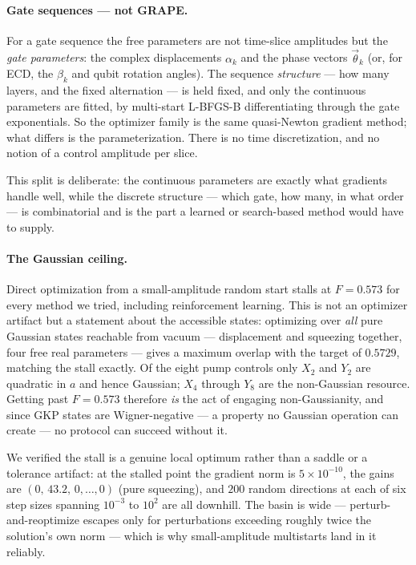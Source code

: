 \documentclass[10pt]{article}
\begin{document}
\paragraph{Gate sequences --- not GRAPE.} For a gate sequence the free parameters
are not time-slice amplitudes but the \emph{gate parameters}: the complex
displacements $\alpha_k$ and the phase vectors $\vec\theta_k$ (or, for ECD, the
$\beta_k$ and qubit rotation angles). The sequence \emph{structure} --- how many
layers, and the fixed alternation --- is held fixed, and only the continuous
parameters are fitted, by multi-start L-BFGS-B differentiating through the gate
exponentials. So the optimizer family is the same quasi-Newton
gradient method; what differs is the parameterization. There is no time
discretization, and no notion of a control amplitude per slice.

This split is deliberate: the continuous parameters are exactly what gradients
handle well, while the discrete structure --- which gate, how many, in what order
--- is combinatorial and is the part a learned or search-based method would have
to supply.

\paragraph{The Gaussian ceiling.} Direct optimization from a small-amplitude
random start stalls at $F=0.573$ for every method we tried, including
reinforcement learning. This is not an optimizer artifact but a statement about
the accessible states: optimizing over \emph{all} pure Gaussian states reachable
from vacuum --- displacement and squeezing together, four free real parameters ---
gives a maximum overlap with the target of $0.5729$, matching the stall exactly.
Of the eight pump controls only $X_2$ and $Y_2$ are quadratic in $a$ and hence
Gaussian; $X_4$ through $Y_8$ are the non-Gaussian resource. Getting past
$F=0.573$ therefore \emph{is} the act of engaging non-Gaussianity, and since GKP
states are Wigner-negative --- a property no Gaussian operation can create --- no
protocol can succeed without it.

We verified the stall is a genuine local optimum rather than a saddle or a
tolerance artifact: at the stalled point the gradient norm is $5\times10^{-10}$,
the gains are $(0,\,43.2,\,0,\dots,0)$ (pure squeezing), and $200$ random
directions at each of six step sizes spanning $10^{-3}$ to $10^{2}$ are all
downhill. The basin is wide --- perturb-and-reoptimize escapes only for
perturbations exceeding roughly twice the solution's own norm --- which is why
small-amplitude multistarts land in it reliably.
\end{document}
